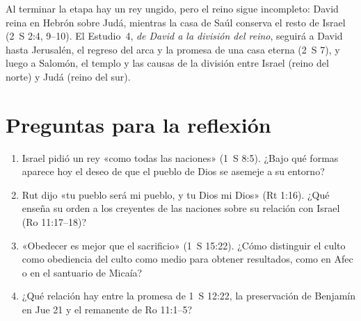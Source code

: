 \documentclass[11pt,letterpaper]{article}
\begin{document}
Al terminar la etapa hay un rey ungido, pero el reino sigue incompleto: David reina en Hebrón sobre Judá, mientras la casa de Saúl conserva el resto de Israel (2~S 2:4, 9--10). El Estudio~4, \emph{de David a la división del reino}, seguirá a David hasta Jerusalén, el regreso del arca y la promesa de una casa eterna (2~S 7), y luego a Salomón, el templo y las causas de la división entre Israel (reino del norte) y Judá (reino del sur).

\section*{Preguntas para la reflexión}
\begin{enumerate}
\item Israel pidió un rey «como todas las naciones» (1~S 8:5). ¿Bajo qué formas aparece hoy el deseo de que el pueblo de Dios se asemeje a su entorno?
\item Rut dijo «tu pueblo será mi pueblo, y tu Dios mi Dios» (Rt 1:16). ¿Qué enseña su orden a los creyentes de las naciones sobre su relación con Israel (Ro 11:17--18)?
\item «Obedecer es mejor que el sacrificio» (1~S 15:22). ¿Cómo distinguir el culto como obediencia del culto como medio para obtener resultados, como en Afec o en el santuario de Micaía?
\item ¿Qué relación hay entre la promesa de 1~S 12:22, la preservación de Benjamín en Jue 21 y el remanente de Ro 11:1--5?
\end{enumerate}
\end{document}
